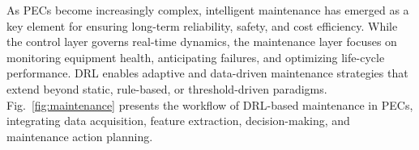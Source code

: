 As PECs become increasingly complex, intelligent maintenance has emerged as a key element for ensuring long-term reliability, safety, and cost efficiency. 
While the control layer governs real-time dynamics, the maintenance layer focuses on monitoring equipment health, anticipating failures, and optimizing life-cycle performance. 
DRL enables adaptive and data-driven maintenance strategies that extend beyond static, rule-based, or threshold-driven paradigms. 
Fig.~\ref{fig:maintenance} presents the workflow of DRL-based maintenance in PECs, integrating data acquisition, feature extraction, decision-making, and maintenance action planning.





